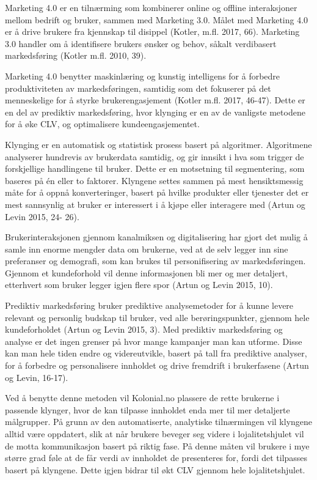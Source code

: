Marketing 4.0 er en tilnærming som kombinerer online og offline interaksjoner mellom bedrift og bruker, sammen med Marketing 3.0. Målet med Marketing 4.0 er å drive brukere fra kjennskap til disippel (Kotler, m.fl. 2017, 66). Marketing 3.0 handler om å identifisere brukers ønsker og behov, såkalt verdibasert markedsføring (Kotler m.fl. 2010, 39). 

Marketing 4.0 benytter maskinlæring og kunstig intelligens for å forbedre produktiviteten av markedsføringen, samtidig som det fokuserer på det menneskelige for å styrke brukerengasjement (Kotler m.fl. 2017, 46-47). Dette er en del av prediktiv markedsføring, hvor klynging er en av de vanligste metodene for å øke CLV, og optimalisere kundeengasjementet. 

Klynging er en automatisk og statistisk prosess basert på algoritmer. Algoritmene analyserer hundrevis av brukerdata samtidig, og gir innsikt i hva som trigger de forskjellige handlingene til bruker. Dette er en motsetning til segmentering, som baseres på én eller to faktorer. Klyngene settes sammen på mest hensiktsmessig måte for å oppnå konverteringer, basert på hvilke produkter eller tjenester det er mest sannsynlig at bruker er interessert i å kjøpe eller interagere med (Artun og Levin 2015, 24- 26). 

Brukerinteraksjonen gjennom kanalmiksen og digitalisering har gjort det mulig å samle inn enorme mengder data om brukerne, ved at de selv legger inn sine preferanser og demografi, som kan brukes til personifisering av markedsføringen. Gjennom et kundeforhold vil denne informasjonen bli mer og mer detaljert, etterhvert som bruker legger igjen flere spor (Artun og Levin 2015, 10). 

Prediktiv markedsføring bruker prediktive analysemetoder for å kunne levere relevant og personlig budskap til bruker, ved alle berøringspunkter, gjennom hele kundeforholdet (Artun og Levin 2015, 3). Med prediktiv markedsføring og analyse er det ingen grenser på hvor mange kampanjer man kan utforme. Disse kan man hele tiden endre og videreutvikle, basert på tall fra prediktive analyser, for å forbedre og personalisere innholdet og drive fremdrift i brukerfasene (Artun og Levin, 16-17).

Ved å benytte denne metoden vil Kolonial.no plassere de rette brukerne i passende klynger, hvor de kan tilpasse innholdet enda mer til mer detaljerte målgrupper. På grunn av den automatiserte, analytiske tilnærmingen vil klyngene alltid være oppdatert, slik at når brukere beveger seg videre i lojalitetshjulet vil de motta kommunikasjon basert på riktig fase. På denne måten vil brukere i mye større grad føle at de får verdi av innholdet de presenteres for, fordi det tilpasses basert på klyngene. Dette igjen bidrar til økt CLV gjennom hele lojalitetshjulet. 

